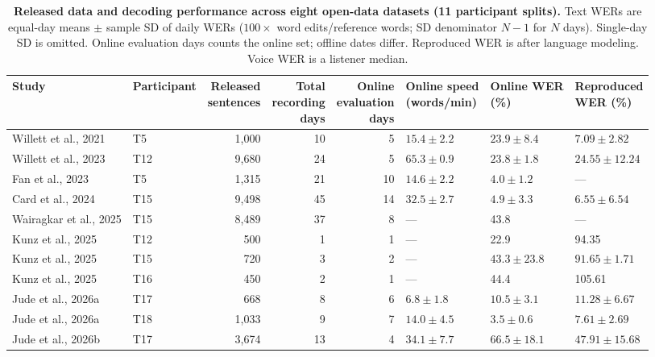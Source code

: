 \documentclass[11pt]{article}
\begin{document}
\begin{table}[t]
\centering
\footnotesize
\setlength{\tabcolsep}{3pt}
\renewcommand{\arraystretch}{1.12}
\caption{\textbf{Released data and decoding performance across eight
open-data datasets (11 participant splits).}
Text WERs are equal-day means $\pm$ sample SD of daily WERs
($100\times$ word edits/reference words; SD denominator $N-1$ for $N$ days).
Single-day SD is omitted. Online evaluation days counts the online set;
offline dates differ. Reproduced WER is after language modeling.
Voice WER is a listener median.}
\label{tab:repro}
\begin{tabular}{@{}>{\raggedright\arraybackslash}p{3.50cm}lrrrlll@{}}
\toprule
Study & Participant & \shortstack[r]{Released\\sentences} & \shortstack[r]{Total\\recording\\days} & \shortstack[r]{Online\\evaluation\\days} & \shortstack[l]{Online speed\\(words/min)} & \shortstack[l]{Online WER\\(\%)} & \shortstack[l]{Reproduced\\WER (\%)} \\
\midrule
Willett et al., 2021 \cite{willett2021} & T5 & 1{,}000 & 10 & 5 & $15.4{\pm}2.2$ & $23.9{\pm}8.4$ & $7.09{\pm}2.82$ \\
Willett et al., 2023 \cite{willett2023} & T12 & 9{,}680 & 24 & 5 & $65.3{\pm}0.9$ & $23.8{\pm}1.8$ & $24.55{\pm}12.24$ \\
Fan et al., 2023 \cite{fan2023} & T5 & 1{,}315 & 21 & 10 & $14.6{\pm}2.2$ & $4.0{\pm}1.2$ & --- \\
Card et al., 2024 \cite{card2024} & T15 & 9{,}498 & 45 & 14 & $32.5{\pm}2.7$ & $4.9{\pm}3.3$ & $6.55{\pm}6.54$ \\
Wairagkar et al., 2025 \cite{wairagkar2025} & T15 & 8{,}489 & 37 & 8 & --- & 43.8 & --- \\
Kunz et al., 2025 \cite{kunz2025} & T12 & 500 & 1 & 1 & --- & 22.9 & 94.35 \\
Kunz et al., 2025 \cite{kunz2025} & T15 & 720 & 3 & 2 & --- & $43.3{\pm}23.8$ & $91.65{\pm}1.71$ \\
Kunz et al., 2025 \cite{kunz2025} & T16 & 450 & 2 & 1 & --- & 44.4 & 105.61 \\
Jude et al., 2026a \cite{jude2026typing} & T17 & 668 & 8 & 6 & $6.8{\pm}1.8$ & $10.5{\pm}3.1$ & $11.28{\pm}6.67$ \\
Jude et al., 2026a \cite{jude2026typing} & T18 & 1{,}033 & 9 & 7 & $14.0{\pm}4.5$ & $3.5{\pm}0.6$ & $7.61{\pm}2.69$ \\
Jude et al., 2026b \cite{jude2026lis} & T17 & 3{,}674 & 13 & 4 & $34.1{\pm}7.7$ & $66.5{\pm}18.1$ & $47.91{\pm}15.68$ \\
\bottomrule
\end{tabular}
\end{table}
\end{document}
